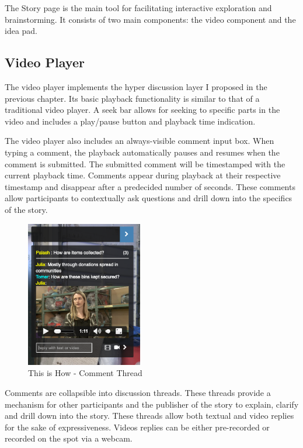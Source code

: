 The Story page is the main tool for facilitating interactive exploration and brainstorming. It consists of two main components: the video component and the idea pad.

\subsection{Video Player}

The video player implements the hyper discussion layer I proposed in the previous chapter. Its basic playback functionality is similar to that of a traditional video player. A seek bar allows for seeking to specific parts in the video and includes a play/pause button and playback time indication.

The video player also includes an always-visible comment input box. When typing a comment, the playback automatically pauses and resumes when the comment is submitted. The submitted comment will be timestamped with the current playback time. Comments appear during playback at their respective timestamp and disappear after a predecided number of seconds. These comments allow participants to contextually ask questions and drill down into the specifics of the story.  

   \begin{figure}[thpb]
      \centering
      \includegraphics[width=2in]{figures/commentthread.png}
      \caption{This is How - Comment Thread}
      \label{fig_comment_thread}
   \end{figure}

Comments are collapsible into discussion threads. These threads provide a mechanism for other participants and the publisher of the story to explain, clarify and drill down into the story. These threads allow both textual and video replies for the sake of expressiveness. Videos replies can be either pre-recorded or recorded on the spot via a webcam. 

